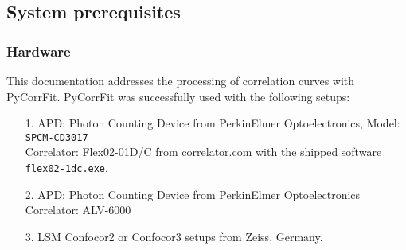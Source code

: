 \subsection{System prerequisites}
\subsubsection{Hardware}
This documentation addresses the processing of correlation curves with PyCorrFit. {PyCorrFit} was successfully used with the following setups:
\begin{itemize}
\item[1.]
     APD: Photon Counting Device from PerkinElmer Optoelectronics, Model: 	 \texttt{SPCM-CD3017}\\
     Correlator: Flex02-01D/C from correlator.com with the shipped software 	
	    		 \texttt{flex02-1dc.exe}.
\item[2.]
    APD: Photon Counting Device from PerkinElmer Optoelectronics\\
    Correlator: ALV-6000
\item[3.] LSM Confocor2 or Confocor3 setups from Zeiss, Germany.
\end{itemize}

